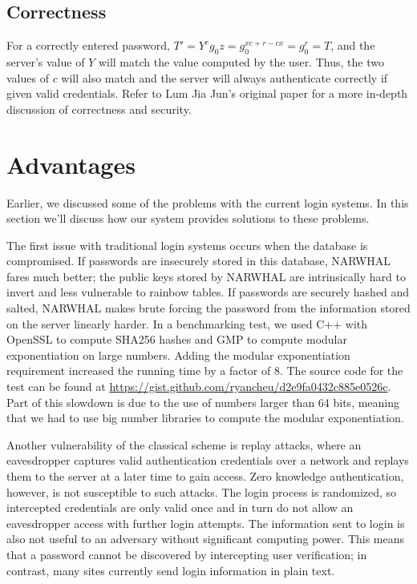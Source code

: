 \documentclass[11pt]{article}
\begin{document}
\subsection{Correctness}

For a correctly entered password, $T' = Y^cg_0z = g_0^{xc + r - cx} = g_0^r = T$, and the server's value of $Y$ will match the value computed by the user.  Thus, the two values of $c$ will also match and the server will always authenticate correctly if given valid credentials.  Refer to Lum Jia Jun's original paper for a more in-depth discussion of correctness and security.


\section{Advantages}

Earlier, we discussed some of the problems with the current login systems.  In this section we'll discuss how our system provides solutions to these problems.

The first issue with traditional login systems occurs when the database is compromised. If passwords are insecurely stored in this database, NARWHAL fares much better; the public keys stored by NARWHAL are intrinsically hard to invert and less vulnerable to rainbow tables. If passwords are securely hashed and salted, NARWHAL makes brute forcing the password from the information stored on the server linearly harder. In a benchmarking test, we used C++ with OpenSSL to compute SHA256 hashes and GMP to compute modular exponentiation on large numbers.  Adding the modular exponentiation requirement increased the running time by a factor of 8. The source code for the test can be found at \url{https://gist.github.com/ryancheu/d2e9fa0432c885e0526c}.  Part of this slowdown is due to the use of numbers larger than 64 bits, meaning that we had to use big number libraries to compute the modular exponentiation.

Another vulnerability of the classical scheme is replay attacks, where an eavesdropper captures valid authentication credentials over a network and replays them to the server at a later time to gain access. Zero knowledge authentication, however, is not susceptible to such attacks.  The login process is randomized, so intercepted credentials are only valid once and in turn do not allow an eavesdropper access with further login attempts.  The information sent to login is also not useful to an adversary without significant computing power.  This means that a password cannot be discovered by intercepting user verification; in contrast, many sites currently send login information in plain text.
\end{document}
